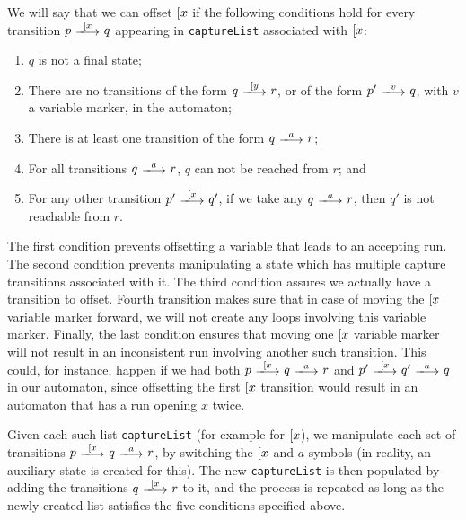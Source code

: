 We will say that we can offset $[ x$ if the following conditions hold for
every transition $p\ \longtrans{\Open{x}}\ q$ appearing in \texttt{captureList}
associated with $[ x$:
\begin{enumerate}
	\item $q$ is not a final state;
	\item There are no transitions of the form $q\ \longtrans{\Open{y}}\ r$, or
	of the form $p'\ \longtrans{v}\ q$, with $v$ a variable marker, in the
	automaton; \label{item:offset-cond-2}
	\item There is at least one transition of the form $q\ \longtrans{a}\ r$;
	\item For all transitions $q\ \longtrans{a}\ r$, $q$ can not be reached from
	$r$; and
	\item For any other transition $p'\ \longtrans{\Open{x}}\ q'$, if we take
	any $q\ \longtrans{a}\ r$, then $q'$ is not reachable from $r$.
\end{enumerate}

The first condition prevents offsetting a variable that leads to an accepting
run. The second condition prevents manipulating a state which has multiple
capture transitions associated with it. The third condition assures we actually
have a transition to offset. Fourth transition makes sure that in case of moving
the $[ x$ variable marker forward, we will not create any loops involving
this variable marker. Finally, the last condition ensures that moving one
$[ x$ variable marker will not result in an inconsistent run involving
another such transition. This could, for instance, happen if we had both $p\
\longtrans{\Open{x}}\ q\ \longtrans{a}\ r$ and $p'\ \longtrans{\Open{x}}\ q'\
\longtrans{a}\ q$ in our automaton, since offsetting the first $[ x$
transition would result in an automaton that has a run opening $x$ twice.

Given each such list \texttt{captureList} (for example for $[ x$), we
manipulate each set of transitions $p\ \longtrans{\Open{x}}\ q\ \longtrans{a}\
r$, by switching the $[ x$ and $a$ symbols (in reality, an auxiliary state
is created for this). The new \texttt{captureList} is then populated by adding
the transitions $q\ \longtrans{\Open{x}}\ r$ to it, and the process is repeated
as long as the newly created list satisfies the five conditions specified above.

